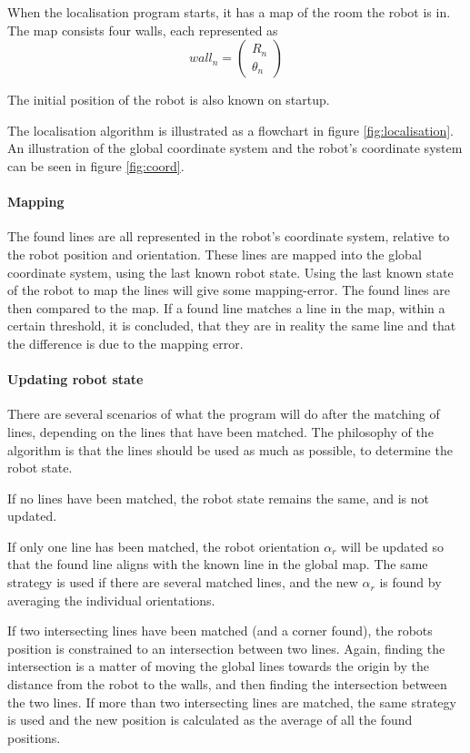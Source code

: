 When the localisation program starts, it has a map of the room the robot is in.
The map consists four walls, each represented as 
$$wall_n = \begin{pmatrix}
R_n\\
\theta_n
\end{pmatrix}
$$

The initial position of the robot is also known on startup.

The localisation algorithm is illustrated as a flowchart in figure \ref{fig:localisation}.
An illustration of the global coordinate system and the robot's coordinate system can be seen 
in figure \ref{fig:coord}.

\paragraph*{Mapping}
The found lines are all represented in the robot's coordinate system, relative to the robot position and orientation.
These lines are mapped into the global coordinate system, using the last known robot state. Using 
the last known state of the robot to map the lines will give some mapping-error.
The found lines are then compared to the map. If a found line matches a line 
in the map, within a certain threshold, it is concluded, that they are in 
reality the same line and that the difference is due to the mapping error.

\paragraph*{Updating robot state}
There are several scenarios of what the program will do after the matching of lines,
depending on the lines that have been matched.
The philosophy of the algorithm is that the lines should be used as much as possible,
to determine the robot state.

If no lines have been matched, the robot state remains the same, and is not updated.

If only one line has been matched, the robot orientation \(\alpha_r\) will be updated
so that the found line aligns with the known line in the global map.
The same strategy is used if there are several matched lines, and the new \(\alpha_r\) is
found by averaging the individual orientations.

If two intersecting lines have been matched (and a corner found), the robots position is constrained to
an intersection between two lines. Again, finding the intersection is a matter of moving the global
lines towards the origin by the distance from the robot to the walls,
and then finding the intersection between the two lines.
If more than two intersecting lines are matched, the same strategy is used and the new position
is calculated as the average of all the found positions.

